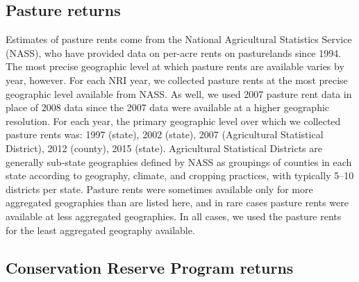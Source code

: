 \documentclass[11pt]{article}
\begin{document}

\subsection{Pasture returns}

Estimates of pasture rents come from the National Agricultural Statistics Service (NASS), who have provided data on per-acre rents on pasturelands since 1994. The most precise geographic level at which pasture rents are available varies by year, however. For each NRI year, we collected pasture rents at the most precise geographic level available from NASS. As well, we used 2007 pasture rent data in place of 2008 data since the 2007 data were available at a higher geographic resolution. For each year, the primary geographic level over which we collected pasture rents was: 1997 (state), 2002 (state), 2007 (Agricultural Statistical District), 2012 (county), 2015 (state). Agricultural Statistical Districts are generally sub-state geographies defined by NASS as groupings of counties in each state according to geography, climate, and cropping practices, with typically 5--10 districts per state. Pasture rents were sometimes available only for more aggregated geographies than are listed here, and in rare cases pasture rents were available at less aggregated geographies. In all cases, we used the pasture rents for the least aggregated geography available.

\subsection{Conservation Reserve Program returns}
\end{document}
